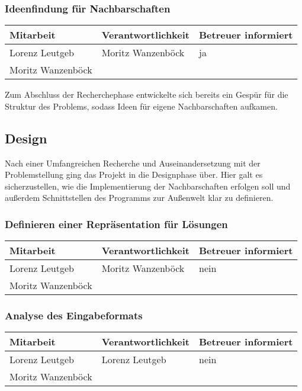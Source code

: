 \subsubsection{ Ideenfindung für Nachbarschaften}

\begin{center}
\begin{tabular}{lll}
	Mitarbeit & Verantwortlichkeit & Betreuer informiert \\
	\hline
	Lorenz Leutgeb & Moritz Wanzenböck & ja \\
	Moritz Wanzenböck & & \\
\end{tabular}
\end{center}

Zum Abschluss der Recherchephase entwickelte sich bereits ein Gespür für die Struktur des Problems, sodass Ideen für eigene Nachbarschaften aufkamen. %

\subsection{Design}
Nach einer Umfangreichen Recherche und Auseinandersetzung mit der Problemstellung ging das Projekt in die Designphase über. Hier galt es sicherzustellen, wie die Implementierung der Nachbarschaften erfolgen soll und außerdem Schnittstellen des Programms zur Außenwelt klar zu definieren.

\subsubsection{ Definieren einer Repräsentation für Lösungen}

\begin{center}
\begin{tabular}{lll}
	Mitarbeit & Verantwortlichkeit & Betreuer informiert \\
	\hline
	Lorenz Leutgeb & Moritz Wanzenböck & nein \\
	Moritz Wanzenböck & & \\
\end{tabular}
\end{center}

\subsubsection{ Analyse des Eingabeformats}

\begin{center}
\begin{tabular}{lll}
	Mitarbeit & Verantwortlichkeit & Betreuer informiert \\
	\hline
	Lorenz Leutgeb & Lorenz Leutgeb & nein \\
	Moritz Wanzenböck & & \\
\end{tabular}
\end{center}

